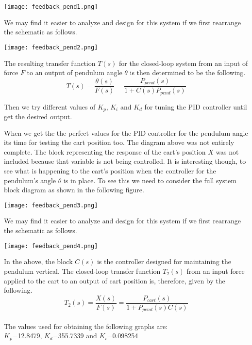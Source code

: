 \documentclass[11pt]{article}
\begin{document}
\begin{center}
    \texttt{[image: feedback\_pend1.png]}
\end{center}
\begin{flushleft}
{We may find it easier to analyze and design for this system if we first rearrange the schematic as follows.}
\end{flushleft}
\begin{center}
    \texttt{[image: feedback\_pend2.png]}
\end{center}
{The resulting transfer function $T(s)$ for the closed-loop system from an input of force $F$ to an output of pendulum angle $\theta$ is then determined to be the following.}
$$ T(s) = \frac{\theta(s)}{F(s)} = \frac{P_{pend}(s)}{1 + C(s)P_{pend}(s)} $$
\begin{flushleft}
{Then we try different values of $K_p$, $K_i$ and $K_d$ for tuning the PID controller until get the desired output.}
\end{flushleft}
{When we get the the perfect values for the PID controller for the pendulum angle its time for testing the cart position too. The diagram above was not entirely complete. The block representing the response of the cart's position $X$ was not included because that variable is not being controlled. It is interesting though, to see what is happening to the cart's position when the controller for the pendulum's angle $\theta$ is in place. To see this we need to consider the full system block diagram as shown in the following figure.}
\begin{center}
    \texttt{[image: feedback\_pend3.png]}
\end{center}
\begin{flushleft}
{We may find it easier to analyze and design for this system if we first rearrange the schematic as follows.}
\end{flushleft}
\begin{center}
    \texttt{[image: feedback\_pend4.png]}
\end{center}
{In the above, the block $C(s)$ is the controller designed for maintaining the pendulum vertical. The closed-loop transfer function $T_2(s)$ from an input force applied to the cart to an output of cart position is, therefore, given by the following.}
$$ T_2(s) = \frac{X(s)}{F(s)} = \frac{P_{cart}(s)}{1 + P_{pend}(s)C(s)}$$
{\\The values used for obtaining the following graphs are:\\
$K_p$=12.8479,  $K_d$=355.7339 and $K_i$=0.098254}
\newpage
\end{document}
